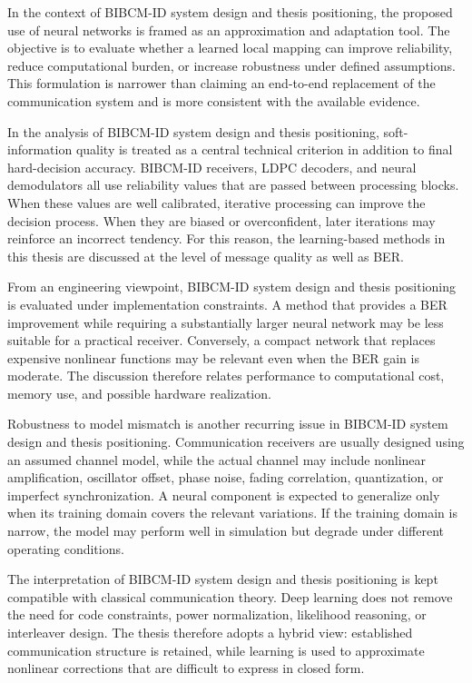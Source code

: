 In the context of BIBCM-ID system design and thesis positioning, the proposed use of neural networks is framed as an approximation and adaptation tool. The objective is to evaluate whether a learned local mapping can improve reliability, reduce computational burden, or increase robustness under defined assumptions. This formulation is narrower than claiming an end-to-end replacement of the communication system and is more consistent with the available evidence.

In the analysis of BIBCM-ID system design and thesis positioning, soft-information quality is treated as a central technical criterion in addition to final hard-decision accuracy. BIBCM-ID receivers, LDPC decoders, and neural demodulators all use reliability values that are passed between processing blocks. When these values are well calibrated, iterative processing can improve the decision process. When they are biased or overconfident, later iterations may reinforce an incorrect tendency. For this reason, the learning-based methods in this thesis are discussed at the level of message quality as well as BER.

From an engineering viewpoint, BIBCM-ID system design and thesis positioning is evaluated under implementation constraints. A method that provides a BER improvement while requiring a substantially larger neural network may be less suitable for a practical receiver. Conversely, a compact network that replaces expensive nonlinear functions may be relevant even when the BER gain is moderate. The discussion therefore relates performance to computational cost, memory use, and possible hardware realization.

Robustness to model mismatch is another recurring issue in BIBCM-ID system design and thesis positioning. Communication receivers are usually designed using an assumed channel model, while the actual channel may include nonlinear amplification, oscillator offset, phase noise, fading correlation, quantization, or imperfect synchronization. A neural component is expected to generalize only when its training domain covers the relevant variations. If the training domain is narrow, the model may perform well in simulation but degrade under different operating conditions.

The interpretation of BIBCM-ID system design and thesis positioning is kept compatible with classical communication theory. Deep learning does not remove the need for code constraints, power normalization, likelihood reasoning, or interleaver design. The thesis therefore adopts a hybrid view: established communication structure is retained, while learning is used to approximate nonlinear corrections that are difficult to express in closed form.


